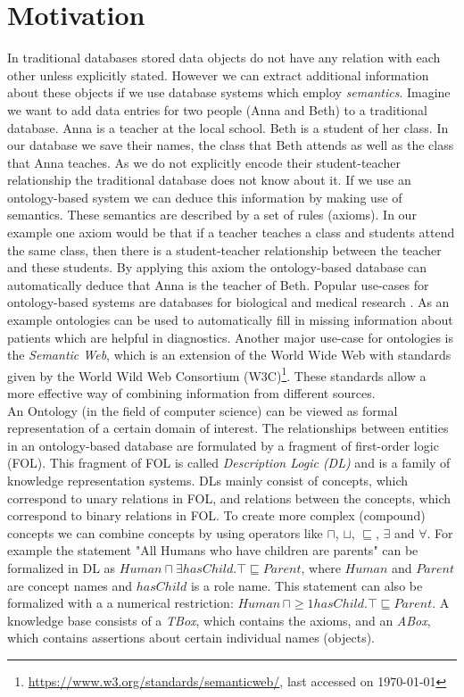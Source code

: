 \documentclass{book}
\theoremstyle{break}
\theoremstyle{definition}
\begin{document}
\section{Motivation}
In traditional databases stored data objects do not have any relation with each other unless explicitly stated. However we can extract additional information about these objects if we use database systems which employ \textit{semantics}.
Imagine we want to add data entries for two people (Anna and Beth) to a traditional database. Anna is a teacher at the local school. Beth is a student of her class. In our database we save their names, the class that Beth attends as well as the class that Anna teaches. As we do not explicitly encode their student-teacher relationship the traditional database does not know about it. If we use an ontology-based system we can deduce this information by making use of semantics. These semantics are described by a set of rules (axioms). In our example one axiom would be that if a teacher teaches a class and students attend the same class, then there is a student-teacher relationship between the teacher and these students. By applying this axiom the ontology-based database can automatically deduce that Anna is the teacher of Beth.  
Popular use-cases for ontology-based systems are databases for biological and medical research \cite{bio}. As an example ontologies can be used to automatically fill in missing information about patients which are helpful in diagnostics. Another major use-case for ontologies is the \textit{Semantic Web}, which is an extension of the World Wide Web with standards given by the World Wild Web Consortium (W3C)\footnote{\url{https://www.w3.org/standards/semanticweb/}, last accessed on \today}. These standards allow a more effective way of combining information from different sources.
\\
An Ontology (in the field of computer science) can be viewed as formal representation of a certain domain of interest. The relationships between entities in an ontology-based database are formulated by a fragment of first-order logic (FOL). This fragment of FOL is called \textit{Description Logic (DL)} and is a family of knowledge representation systems. DLs mainly consist of concepts, which correspond to unary relations in FOL, and relations between the concepts, which correspond to binary relations in FOL. To create more complex (compound) concepts we can combine concepts by using operators like $\sqcap$, $\sqcup$, $\sqsubseteq$, $\exists$ and $\forall$. For example the statement "All Humans who have children are parents" can be formalized  in DL as $Human\sqcap \exists hasChild.\top \sqsubseteq Parent$, where $Human$ and $Parent$ are concept names and $hasChild$ is a role name. This statement can also be formalized with a a numerical restriction: $Human \,\sqcap \geq 1 hasChild.\top\sqsubseteq Parent$. A knowledge base consists of a \textit{TBox}, which contains the axioms, and an \textit{ABox}, which contains assertions about certain individual names (objects). \\ 
\end{document}
